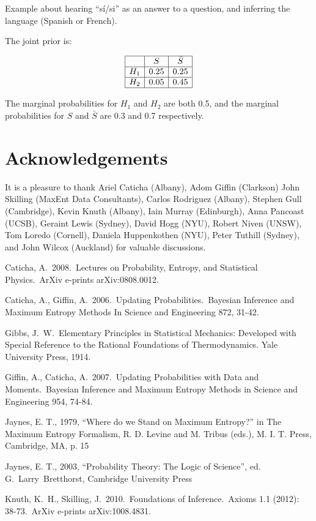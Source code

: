 \documentclass[a4paper, 11pt]{article}
\begin{document}
Example about hearing ``sí/si'' as an answer to a question,
and inferring the language (Spanish or French).

The joint prior is:

\begin{eqnarray}
\begin{array}{|c|c|c|}
\hline
	&	S	& \bar{S}\\
\hline
H_1 & 0.25  & 0.25\\
\hline
H_2 & 0.05 & 0.45\\
\hline
\end{array}
\end{eqnarray}

The marginal probabilities for $H_1$ and $H_2$ are both 0.5, and the
marginal probabilities for $S$ and $\bar{S}$ are 0.3 and 0.7 respectively.



\section*{Acknowledgements}
It is a pleasure to thank
Ariel Caticha (Albany),
Adom Giffin (Clarkson)
John Skilling (MaxEnt Data Consultants),
Carlos Rodriguez (Albany),
Stephen Gull (Cambridge),
Kevin Knuth (Albany),
Iain Murray (Edinburgh),
Anna Pancoast (UCSB),
Geraint Lewis (Sydney),
David Hogg (NYU),
Robert Niven (UNSW),
Tom Loredo (Cornell),
Daniela Huppenkothen (NYU),
Peter Tuthill (Sydney),
and John Wilcox (Auckland)
for valuable discussions.


\begin{thebibliography}{}
 Caticha, A.\ 2008.\ Lectures 
on Probability, Entropy, and Statistical Physics.\ ArXiv e-prints 
arXiv:0808.0012. 

 Caticha, A., 
Giffin, A.\ 2006.\ Updating Probabilities.\ Bayesian Inference and Maximum 
Entropy Methods In Science and Engineering 872, 31-42.

 Gibbs, J.~W.~Elementary Principles in
Statistical Mechanics: Developed with Special Reference to the Rational
Foundations of Thermodynamics. Yale University Press, 1914.

 Giffin, A., 
Caticha, A.\ 2007.\ Updating Probabilities with Data and Moments.\ Bayesian 
Inference and Maximum Entropy Methods in Science and Engineering 954, 
74-84.

 Jaynes, E. T., 1979, ``Where do we Stand on Maximum Entropy?'' in The Maximum Entropy Formalism, R. D. Levine and M. Tribus (eds.), M. I. T. Press, Cambridge, MA, p. 15

 Jaynes, E. T., 2003, ``Probability Theory:
The Logic of Science'', ed. G.~Larry~Bretthorst, Cambridge University Press

 Knuth, K.~H., 
Skilling, J.\ 2010.\ Foundations of Inference.\
Axioms 1.1 (2012): 38-73.\
ArXiv e-prints arXiv:1008.4831. 
\end{thebibliography}
\end{document}
